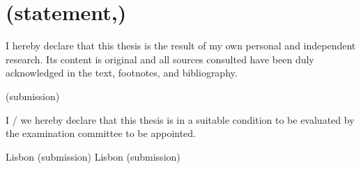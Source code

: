 \makeatletter

\chapter{\GetBkmString(statement,\@LANG@MAIN)}

\vfill

I hereby declare that this thesis is the result of my own personal and independent research. 
Its content is original and all sources consulted have been duly acknowledged in the text, footnotes, and bibliography.

 {\GetDocDate(submission)}


\vfill


I / we hereby declare that this thesis is in a suitable condition to be evaluated by the examination committee to be appointed.

 {Lisbon} {\GetDocDate(submission)}
 {Lisbon} {\GetDocDate(submission)}

\vfill\null

\makeatother
